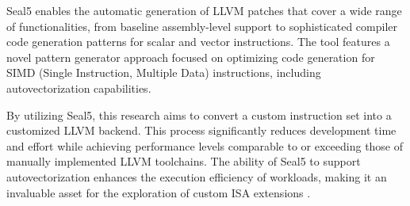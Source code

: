 Seal5 enables the automatic generation of LLVM patches that cover a wide range of functionalities, from baseline assembly-level support to sophisticated compiler code generation patterns for scalar and vector instructions. The tool features a novel pattern generator approach focused on optimizing code generation for SIMD (Single Instruction, Multiple Data) instructions, including autovectorization capabilities.

By utilizing Seal5, this research aims to convert a custom instruction set into a customized LLVM backend. This process significantly reduces development time and effort while achieving performance levels comparable to or exceeding those of manually implemented LLVM toolchains. The ability of Seal5 to support autovectorization enhances the execution efficiency of workloads, making it an invaluable asset for the exploration of custom ISA extensions \cite{Seal5}.